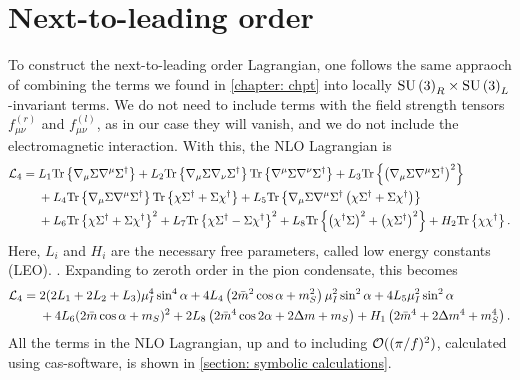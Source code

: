 \section{Next-to-leading order}
\label{section: nlo chpt}


To construct the next-to-leading order Lagrangian, one follows the same appraoch of combining the terms we found in \autoref{chapter: chpt} into locally $\text{SU}\left(3\right)_R\times\text{SU}\left(3\right)_L$-invariant terms.
We do not need to include terms with the field strength tensors $f_{\mu\nu}^{(r)}$ and $f_{\mu\nu}^{(l)}$, as in our case they will vanish, and we do not include the electromagnetic interaction.
With this, the NLO Lagrangian is~\autocite{gasserChiralPerturbationTheory1985}
%
\begin{align}
    \label{NLO Lagrangian three flavor}
    \nonumber
    \mathcal{L}_4 
    ={} &
    L_1\text{Tr} \left\{ \nabla_\mu \Sigma \nabla^\mu \Sigma^\dagger \right\}
    + L_2 \text{Tr} \left\{ \nabla_\mu \Sigma \nabla_\nu \Sigma^\dagger \right\} 
    \text{Tr} \left\{ \nabla^\mu \Sigma \nabla^\nu \Sigma^\dagger \right\}
    + L_3 \text{Tr} \left\{ \left(\nabla_\mu \Sigma \nabla^\mu \Sigma^\dagger\right)^2 \right\} \\ \nonumber
    & + L_4 \text{Tr} \left\{ \nabla_\mu \Sigma \nabla^\mu \Sigma^\dagger \right\} 
    \text{Tr} \left\{ \chi \Sigma^\dagger + \Sigma \chi^\dagger \right\}
    + L_5 \text{Tr} \left\{ 
        \nabla_\mu \Sigma \nabla^\mu \Sigma^\dagger 
        \left(\chi \Sigma^\dagger + \Sigma \chi^\dagger\right)
     \right\}\\
    &+ L_6 \text{Tr} \left\{ \chi \Sigma^\dagger + \Sigma \chi^\dagger \right\}^2 
     + L_7 \text{Tr} \left\{ \chi \Sigma^\dagger - \Sigma \chi^\dagger \right\}^2
    + L_8 \text{Tr} \left\{  \left(\chi^\dagger \Sigma \right)^2 + \left(\chi \Sigma^\dagger \right)^2 \right\}
    + H_2 \text{Tr} \left\{ \chi \chi^\dagger \right\}.
\end{align}
%
Here, $L_i$ and $H_i$ are the necessary free parameters, called low energy constants (LEO).
.
Expanding to zeroth order in the pion condensate, this becomes
%
\begin{align}
    \nonumber
    \mathcal{L}_4
    = {}&
    2(2L_1 + 2L_2 + L_3) \mu_I^4 \sin^4\alpha
    + 4  L_4 \left( 2 \bar m^2 \cos\alpha + m_S^2 \right) \mu_I^2\sin^2\alpha
    + 4 L_5 \mu_I^2\sin^2 \alpha 
    \\ & 
    + 4 L_6 (2\bar m\cos\alpha + m_S)^2
    + 2 L_8 \left(2 \bar m^4 \cos2\alpha + 2 \Delta m + m_S\right)
    + H_1 \left(2\bar m^4 + 2\Delta m^4 + m_S^4 \right).
\end{align}
%
All the terms in the NLO Lagrangian, up and to including  $\mathcal O((\pi/f)^2)$, calculated using cas-software, is shown in \autoref{section: symbolic calculations}.

